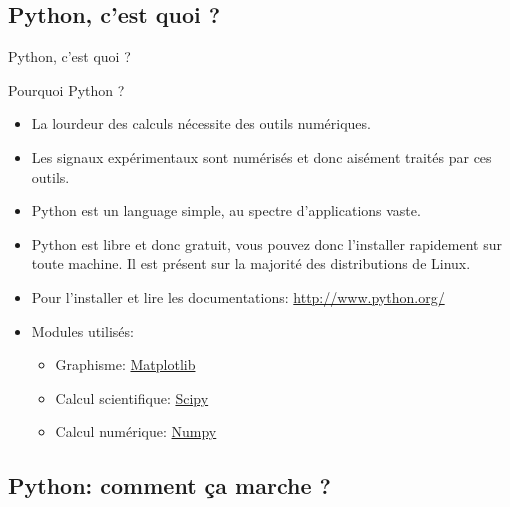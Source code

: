 \documentclass[8pt,a4paper]{beamer}
\begin{document}
  \subsection{Python, c'est quoi ?}
  \begin{frame}{Python, c'est quoi ?}
  \begin{block}{Pourquoi Python ?}
  \begin{itemize}
  \item La lourdeur des calculs nécessite des outils numériques.
  \item Les signaux expérimentaux sont numérisés et donc aisément traités par ces outils.
  \item Python est un language simple, au spectre d'applications vaste.
  \item Python est libre et donc gratuit, vous pouvez donc l'installer rapidement sur toute machine. Il est présent sur la majorité des distributions de Linux.
  \item Pour l'installer et lire les documentations: \href{http://www.python.org/}{http://www.python.org/}
  \item Modules utilisés: 
  \begin{itemize}
  \item Graphisme: \href{http://matplotlib.sourceforge.net/}{Matplotlib}
  \item Calcul scientifique: \href{http://www.scipy.org/}{Scipy}
  \item Calcul numérique: \href{http://numpy.scipy.org/}{Numpy}
  \end{itemize}
  \end{itemize}
  \end{block}
  \end{frame}
  \subsection{Python: comment ça marche ?}
  
  
  
\end{document}
